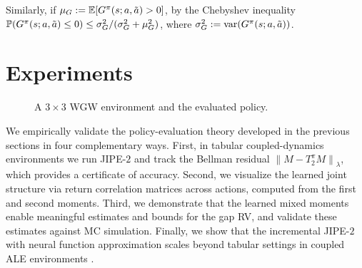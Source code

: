 \documentclass[accepted]{uai2026}
\theoremstyle{plain}
\theoremstyle{definition}
\theoremstyle{remark}
\newcommand{\E}{\mathbb{E}}
\newcommand{\1}{\mathbbm{1}}
\newcommand{\norm}[1]{\left\lVert #1\right\rVert}
\begin{document}
Similarly, if $\mu_G := \E[G^\pi(s; a, \Tilde{a})>\allowbreak 0]$, by the Chebyshev inequality \citep{boucheron2013} $\mathbb{P}(G^\pi(s; a, \Tilde{a}) \le\allowbreak 0 ) \le \allowbreak\sigma^2_G/(\sigma^2_G + \mu^2_G)$, where $\sigma^2_G \allowbreak := \mathrm{var}(G^\pi(s; a, \Tilde{a}))$.
\section{Experiments}

\begin{figure}

    \caption{A $3\times3$ WGW environment and the evaluated policy.}
    \vspace{-5mm}
    \label{wgwpolicy}
\label{fig:wgw}
\end{figure}
We empirically validate the policy-evaluation theory developed in the previous sections in four complementary ways. First, in tabular coupled-dynamics environments we run JIPE-$2$ and track the Bellman residual $\norm{M - T^\pi_2 M}_\lambda$, which provides a certificate of accuracy. Second, we visualize the learned joint structure via return correlation matrices across actions, computed from the first and second moments. Third, we demonstrate that the learned mixed moments enable meaningful estimates and bounds for the gap RV, and validate these estimates against MC simulation. Finally, we show that the incremental JIPE-$2$ with neural function approximation scales beyond tabular settings in coupled ALE environments \cite{ALE}.
\end{document}
